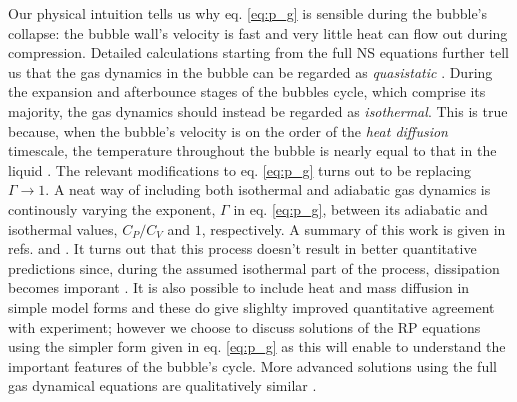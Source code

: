 \documentclass[rmp,aps,nofootinbib,superscriptaddress,floatfix]{revtex4-2}
\begin{document}
Our physical intuition tells us why eq. \ref{eq:p_g} is sensible during the bubble's collapse: the bubble wall's velocity is fast and very little heat can flow out during compression. Detailed calculations starting from the full NS equations further tell us that the gas dynamics in the bubble can be regarded as \emph{quasistatic} \cite{}. During the expansion and afterbounce stages of the bubbles cycle, which comprise its majority, the gas dynamics should instead be regarded as \emph{isothermal}. This is true because, when the bubble's velocity is on the order of the \emph{heat diffusion} timescale, the temperature throughout the bubble is nearly equal to that in the liquid \cite{prosperetti1999old,brenner2002single,yasui2018acoustic}. The relevant modifications to eq. \ref{eq:p_g} turns out to be replacing $\Gamma\rightarrow 1$. A neat way of including both isothermal and adiabatic gas dynamics is continously varying the exponent, $\Gamma$ in eq. \ref{eq:p_g}, between its adiabatic and isothermal values, $C_P/C_V$ and $1$, respectively. A summary of this work is given in refs. \cite{brenner2002single} and \cite{prosperetti1999old}. It turns out that this process doesn't result in better quantitative predictions since, during the assumed isothermal part of the process, dissipation becomes imporant \cite{brenner2002single}. It is also possible to include heat and mass diffusion in simple model forms and these do give slighlty improved quantitative agreement with experiment; however we choose to discuss solutions of the RP equations using the simpler form given in eq. \ref{eq:p_g} as this will enable to understand the important features of the bubble's cycle. More advanced solutions using the full gas dynamical equations are qualitatively similar \cite{brenner2002single,yasui2018acoustic}.
\end{document}
